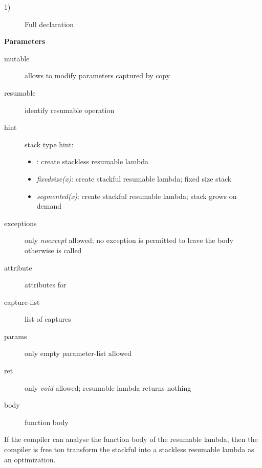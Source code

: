 \begin{description}
    \item[1)] Full declaration
\end{description}

{\bf Parameters}
\begin{description}
    \item[mutable]      allows to modify parameters captured by copy
    \item[resumable]    identify resumable operation
    \item[hint]         stack type hint:
                        \begin{itemize}
                            \item <no hint specified>: create stackless
                                  resumable lambda
                            \item \textit{fixedsize(x)}: create stackful
                                  resumable lambda; fixed size stack
                            \item \textit{segmented(x)}: create stackful
                                  resumable lambda; stack grows on demand
                        \end{itemize}
    \item[exceptions]   only \textit{noexcept} allowed; no exception is
                        permitted to leave the body otherwise
                         is called
    \item[attribute]    attributes for 
    \item[capture-list] list of captures
    \item[params]       only empty parameter-list allowed
    \item[ret]          only \textit{void} allowed; resumable lambda returns nothing
    \item[body]         function body\\
\end{description}

If the compiler can analyse the function body of the resumable lambda, then the
compiler is free ton transform the stackful into a stackless resumable lambda as
an optimization.
